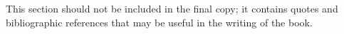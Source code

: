
This section should not be included in the final copy;
it contains quotes and bibliographic references that may be useful in the writing of the book.

\vspace{1em}

